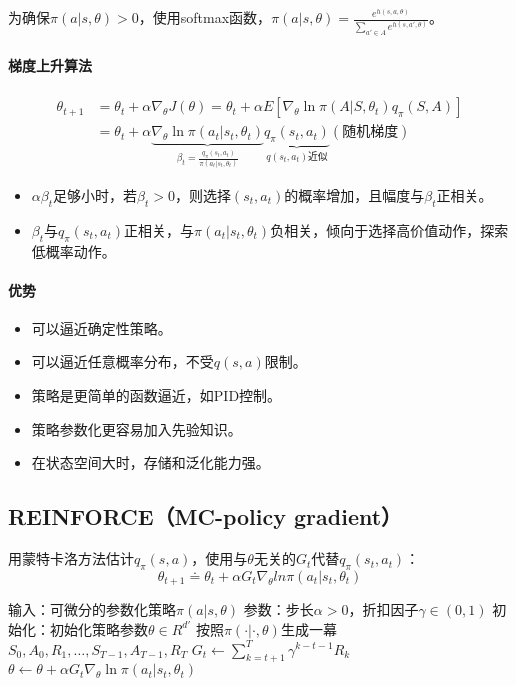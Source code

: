 \documentclass[
12pt, %
a4paper, 
oneside, %
headinclude,footinclude, %
]{scrartcl}
\begin{document}
为确保$ \pi(a|s, \theta) > 0 $，使用softmax函数，$ \pi(a|s, \theta) = \frac{e^{h(s, a, \theta)}}{\sum_{a' \in A} e^{h(s, a', \theta)}} $。
\paragraph{梯度上升算法}
\begin{align*}
\theta_{t + 1} &= \theta_t + \alpha\nabla_\theta J(\theta) = \theta_t + \alpha E[\nabla_\theta \ln \pi(A|S, \theta_t) q_\pi(S, A)] \\
&= \theta_t + \alpha \underbrace{\nabla_\theta \ln \pi(a_t|s_t, \theta_t)}_{\beta_t = \frac{q_\pi(s_t, a_t)}{\pi(a_t|s_t, \theta_t)}} \underbrace{q_\pi(s_t, a_t)}_{q(s_t, a_t)\text{近似}} (\text{随机梯度})
\end{align*}    

\begin{itemize}
\item $ \alpha\beta_t $足够小时，若$ \beta_t > 0 $，则选择$ (s_t, a_t) $的概率增加，且幅度与$ \beta_t $正相关。
\item $ \beta_t $与$ q_{\pi}(s_t, a_t) $正相关，与$ \pi(a_t|s_t, \theta_t) $负相关，倾向于选择高价值动作，探索低概率动作。
\end{itemize}
\paragraph{优势}
\begin{itemize}
\item 可以逼近确定性策略。
\item 可以逼近任意概率分布，不受$ q(s, a) $限制。
\item 策略是更简单的函数逼近，如PID控制。
\item 策略参数化更容易加入先验知识。
\item 在状态空间大时，存储和泛化能力强。
\end{itemize}
\subsection[REINFORCE]{REINFORCE（MC-policy gradient）}
用蒙特卡洛方法估计$ q_\pi(s, a) $，使用与$ \theta $无关的$ G_t $代替$ q_\pi(s_t, a_t) $：
$$ \theta_{t + 1} \doteq \theta_t + \alpha G_t \nabla_{\theta} ln \pi (a_t|s_t, \theta_t) $$
\begin{myalgorithm}[REINFORCE]
\State 输入：可微分的参数化策略$ \pi(a|s, \theta) $
\State 参数：步长$ \alpha > 0 $，折扣因子$ \gamma \in (0, 1) $
\State 初始化：初始化策略参数$ \theta \in R^{d'} $
\Loop {}
\State 按照$ \pi(\cdot|\cdot, \theta) $生成一幕$ S_0, A_0, R_1, \ldots, S_{T - 1}, A_{T - 1}, R_T $
\State $ G_t \gets \sum_{k = t + 1}^{T} \gamma^{k - t - 1}R_k $ 
\State $ \theta \gets \theta + \alpha G_t \nabla_{\theta} \ln \pi(a_t|s_t, \theta_t) $
\EndFor
\EndLoop
\end{myalgorithm}
\end{document}
